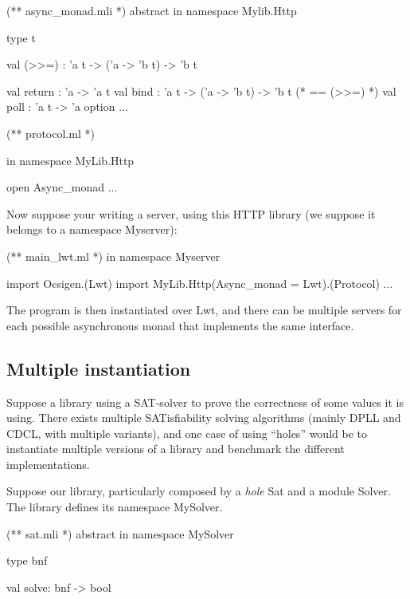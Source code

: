 \documentclass[11pt,a4paper]{article}
\begin{document}
\begin{OCaml}
(** async_monad.mli *)
abstract in namespace Mylib.Http

type t

val (>>=) : 'a t -> ('a -> 'b t) -> 'b t

val return : 'a -> 'a t
val bind : 'a t -> ('a -> 'b t) -> 'b t (* == (>>=) *)
val poll : 'a t -> 'a option
...
\end{OCaml}

\medskip

\begin{OCaml}
(** protocol.ml *)

in namespace MyLib.Http

open Async_monad
...
\end{OCaml}

\medskip

Now suppose your writing a server, using this HTTP library (we suppose it belongs
to a namespace Myserver):

\begin{OCaml}
(** main_lwt.ml *)
in namespace Myserver

import Ocsigen.(Lwt)
import MyLib.Http(Async_monad = Lwt).(Protocol)
...
\end{OCaml}

The program is then instantiated over Lwt, and there can be multiple servers for
each possible asynchronous monad that implements the same interface.

\subsection{Multiple instantiation}

Suppose a library using a SAT-solver to prove the correctness of some values it
is using. There exists multiple SATisfiability solving algorithms (mainly DPLL
and CDCL, with multiple variants), and one case of using ``holes'' would be to
instantiate multiple versions of a library and benchmark the different
implementations.

Suppose our library, particularly composed by a \emph{hole} Sat and a module
Solver. The library defines its namespace MySolver.

\begin{OCaml}
(** sat.mli *)
abstract in namespace MySolver

type bnf

val solve: bnf -> bool
\end{OCaml}
\end{document}
